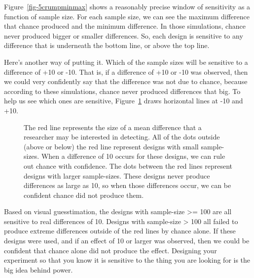\documentclass[
  letterpaper,
  DIV=11,
  numbers=noendperiod]{scrreprt}
\begin{document}
Figure~\ref{fig-5crumpminmax} shows a reasonably precise window of
sensitivity as a function of sample size. For each sample size, we can
see the maximum difference that chance produced and the minimum
difference. In those simulations, chance never produced bigger or
smaller differences. So, each design is sensitive to any difference that
is underneath the bottom line, or above the top line.

Here's another way of putting it. Which of the sample sizes will be
sensitive to a difference of +10 or -10. That is, if a difference of +10
or -10 was observed, then we could very confidently say that the
difference was not due to chance, because according to these
simulations, chance never produced differences that big. To help us see
which ones are sensitive, Figure~\ref{fig-5crumpredline} draws
horizontal lines at -10 and +10.

\begin{figure}


\caption{\label{fig-5crumpredline}The red line represents the size of a
mean difference that a researcher may be interested in detecting. All of
the dots outside (above or below) the red line represent designs with
small sample-sizes. When a difference of 10 occurs for these designs, we
can rule out chance with confidence. The dots between the red lines
represent designs with larger sample-sizes. These designs never produce
differences as large as 10, so when those differences occur, we can be
confident chance did not produce them.}

\end{figure}%

Based on visual guesstimation, the designs with sample-size
\textgreater= 100 are all sensitive to real differences of 10. Designs
with sample-size \textgreater{} 100 all failed to produce extreme
differences outside of the red lines by chance alone. If these designs
were used, and if an effect of 10 or larger was observed, then we could
be confident that chance alone did not produce the effect. Designing
your experiment so that you know it is sensitive to the thing you are
looking for is the big idea behind power.
\end{document}
